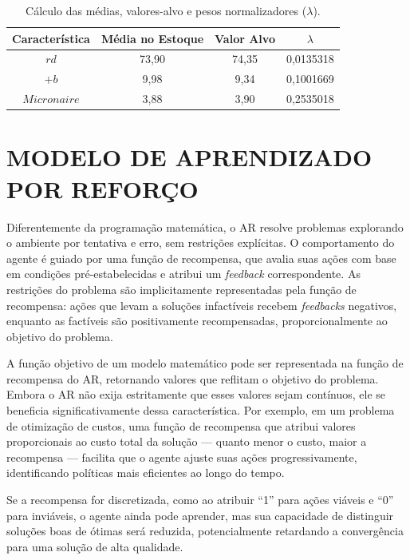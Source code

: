 \documentclass[
    12pt,                %
    openright,           %
    oneside,             %
    a4paper,             %
    english,             %
    spanish,             %
    brazil               %
]{ufscar}
\begin{document}
\begin{table}[htp]
    \centering
    \caption{Cálculo das médias, valores-alvo e pesos normalizadores (\(\lambda\)).}
    \begin{tabular}{c c c c}
         Característica & Média no Estoque & Valor Alvo & \(\lambda\) \\
         \hline
         \(rd\)         & 73,90  & 74,35  & 0,0135318 \\ 
         \(+b\)         & 9,98   & 9,34   & 0,1001669 \\ 
         \(Micronaire\) & 3,88   & 3,90   & 0,2535018 \\ 
         \hline
    \end{tabular}
    \label{tab:valores_lambda}
\end{table}

\chapter{MODELO DE APRENDIZADO POR REFORÇO}

Diferentemente da programação matemática, o AR resolve problemas explorando o ambiente por tentativa e erro, sem restrições explícitas. O comportamento do agente é guiado por uma função de recompensa, que avalia suas ações com base em condições pré-estabelecidas e atribui um \textit{feedback} correspondente. As restrições do problema são implicitamente representadas pela função de recompensa: ações que levam a soluções infactíveis recebem \textit{feedbacks} negativos, enquanto as factíveis são positivamente recompensadas, proporcionalmente ao objetivo do problema.

A função objetivo de um modelo matemático pode ser representada na função de recompensa do AR, retornando valores que reflitam o objetivo do problema. Embora o AR não exija estritamente que esses valores sejam contínuos, ele se beneficia significativamente dessa característica. Por exemplo, em um problema de otimização de custos, uma função de recompensa que atribui valores proporcionais ao custo total da solução — quanto menor o custo, maior a recompensa — facilita que o agente ajuste suas ações progressivamente, identificando políticas mais eficientes ao longo do tempo.

Se a recompensa for discretizada, como ao atribuir ``1'' para ações viáveis e ``0'' para inviáveis, o agente ainda pode aprender, mas sua capacidade de distinguir soluções boas de ótimas será reduzida, potencialmente retardando a convergência para uma solução de alta qualidade. 
\end{document}
